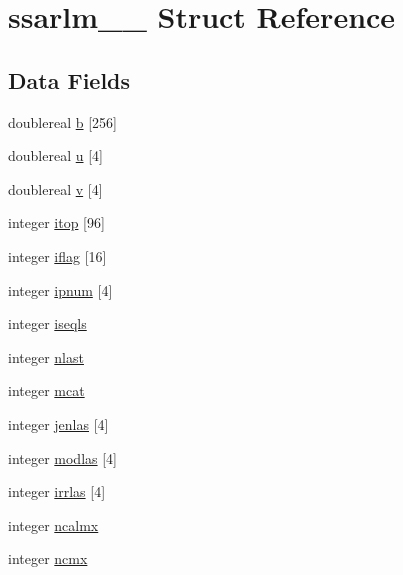 \hypertarget{structssarlm__1__}{}\section{ssarlm\+\_\+\_\+ Struct Reference}
\label{structssarlm__1__}
\subsection*{Data Fields}
\begin{DoxyCompactItemize}
\item 
doublereal \hyperlink{structssarlm__1___a2d1c77d268970034fa768539a0c9c370}{b} \mbox{[}256\mbox{]}
\item 
doublereal \hyperlink{structssarlm__1___acd10fab3db576eb1dab510d085dc18f1}{u} \mbox{[}4\mbox{]}
\item 
doublereal \hyperlink{structssarlm__1___a6906d42d2736bd2abc40f3fef36deb81}{v} \mbox{[}4\mbox{]}
\item 
integer \hyperlink{structssarlm__1___ac3a333b128d56af085fd862ffc7332f7}{itop} \mbox{[}96\mbox{]}
\item 
integer \hyperlink{structssarlm__1___accbbfa60e94bfa97aca4031ff38dc941}{iflag} \mbox{[}16\mbox{]}
\item 
integer \hyperlink{structssarlm__1___aea84159ad2e7948b955742d829a4cf70}{ipnum} \mbox{[}4\mbox{]}
\item 
integer \hyperlink{structssarlm__1___a190c86858cc921d83daba5643d2f421b}{iseqls}
\item 
integer \hyperlink{structssarlm__1___a90ce3bb9aa7af3f97dcd3e0a1d16b548}{nlast}
\item 
integer \hyperlink{structssarlm__1___a368c3146c160a83162fd7a9e58e722e3}{mcat}
\item 
integer \hyperlink{structssarlm__1___aea0c0786b21332d5cd8f09a995cd0019}{jenlas} \mbox{[}4\mbox{]}
\item 
integer \hyperlink{structssarlm__1___ac15e11bbc5e78c8d3dadc166e45f194d}{modlas} \mbox{[}4\mbox{]}
\item 
integer \hyperlink{structssarlm__1___a6828214b1a29c2fe9dd1aca1e16bc160}{irrlas} \mbox{[}4\mbox{]}
\item 
integer \hyperlink{structssarlm__1___aa5557560196e93ec7cdaf87ca9c03964}{ncalmx}
\item 
integer \hyperlink{structssarlm__1___ac76cd0e3e038c0ffb883d679ce19f1c0}{ncmx}
\end{DoxyCompactItemize}


